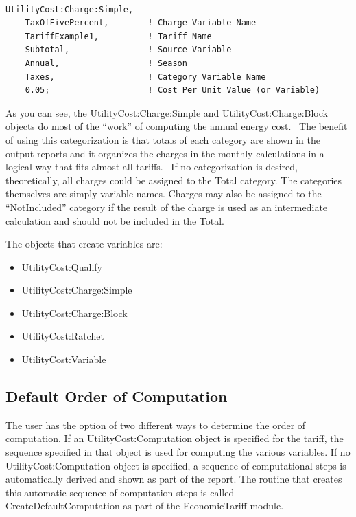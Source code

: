 \begin{lstlisting}

UtilityCost:Charge:Simple,
    TaxOfFivePercent,        ! Charge Variable Name
    TariffExample1,          ! Tariff Name
    Subtotal,                ! Source Variable
    Annual,                  ! Season
    Taxes,                   ! Category Variable Name
    0.05;                    ! Cost Per Unit Value (or Variable)
\end{lstlisting}

As you can see, the UtilityCost:Charge:Simple and UtilityCost:Charge:Block objects do most of the ``work'' of computing the annual energy cost.~ The benefit of using this categorization is that totals of each category are shown in the output reports and it organizes the charges in the monthly calculations in a logical way that fits almost all tariffs.~ If no categorization is desired, theoretically, all charges could be assigned to the Total category. The categories themselves are simply variable names. Charges may also be assigned to the ``NotIncluded'' category if the result of the charge is used as an intermediate calculation and should not be included in the Total.

The objects that create variables are:

\begin{itemize}
\item
  UtilityCost:Qualify
\item
  UtilityCost:Charge:Simple
\item
  UtilityCost:Charge:Block
\item
  UtilityCost:Ratchet
\item
  UtilityCost:Variable
\end{itemize}

\subsection{Default Order of Computation}\label{default-order-of-computation}

The user has the option of two different ways to determine the order of computation. If an UtilityCost:Computation object is specified for the tariff, the sequence specified in that object is used for computing the various variables. If no UtilityCost:Computation object is specified, a sequence of computational steps is automatically derived and shown as part of the report. The routine that creates this automatic sequence of computation steps is called CreateDefaultComputation as part of the EconomicTariff module.

